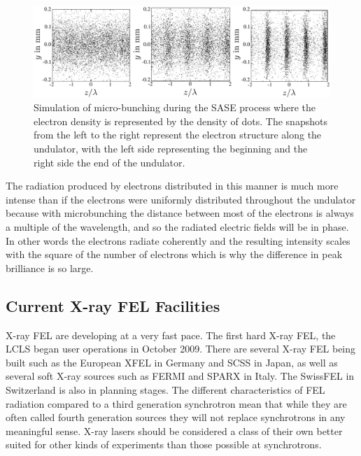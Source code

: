 \begin{figure}[h]
\centering
  \includegraphics[width=1.0 \columnwidth]{micro-bunching.png}
  \caption{Simulation of micro-bunching during the SASE process where the
    electron density is represented by the density of dots. The snapshots
    from the left to the right represent the electron structure along the
    undulator, with the left side representing the beginning and the right side
    the end of the undulator. \cite{Materlik2001TESLA}}
  \label{Fig:Brilliance}
\end{figure}

The radiation produced by electrons distributed in this manner is much more
intense than if the electrons were uniformly distributed throughout the
undulator because with microbunching the distance between most of the electrons is
always a multiple of the wavelength, and so the radiated electric fields will be
in phase. In other words the electrons radiate coherently and the resulting
intensity scales with the square of the number of electrons which is why the
difference in peak brilliance is so large.

\subsection{Current X-ray FEL Facilities}

X-ray FEL are developing at a very fast pace. The first hard X-ray FEL, the LCLS
began user operations in October 2009.
There are several X-ray FEL
being built such as the European XFEL in Germany and SCSS
in Japan,
as well as several soft X-ray sources such as FERMI and SPARX
in Italy. The SwissFEL in Switzerland is also in planning stages. 
The different characteristics of FEL radiation compared to a third generation synchrotron mean that while they are
often called fourth generation sources they will not replace synchrotrons in any
meaningful sense.
X-ray lasers should be considered a class of
their own better suited for other kinds of experiments than those possible at synchrotrons.

